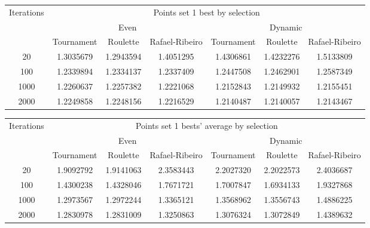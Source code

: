 \begin{center}
	\begin{tabular}{|c|c|c|c|c|c|c|}
		\hline
		\multirow{3}{*}{Iterations}	&	\multicolumn{6}{c|}{Points set 1 best by selection}	\\
										\cline{2-7}
									&	\multicolumn{3}{c|}{Even}	& \multicolumn{3}{c|}{Dynamic} \\
										\cline{2-7}
									&	Tournament		&	Roulette		&	Rafael-Ribeiro	&	Tournament		&	Roulette		&	Rafael-Ribeiro		\\
		\hline
		20							&	1.3035679		& 	1.2943594		&	1.4051295		&	1.4306861		&	1.4232276		&	1.5133809			\\
		\hline
		100							&	1.2339894		&	1.2334137		&	1.2337409		&	1.2447508		&	1.2462901		&	1.2587349			\\
		\hline
		1000						&	1.2260637		&	1.2257382		&	1.2221068		&	1.2152843		&	1.2149932		&	1.2155451			\\
		\hline
		2000						&	1.2249858		&	1.2248156		&	1.2216529		&	1.2140487		&	1.2140057		&	1.2143467			\\
		\hline
	\end{tabular}
	\label{tab:selection_type_1_best}
\end{center}

\begin{center}
	\begin{tabular}{|c|c|c|c|c|c|c|}
		\hline
		\multirow{3}{*}{Iterations}	&	\multicolumn{6}{c|}{Points set 1 bests' average by selection}	\\
										\cline{2-7}
									&	\multicolumn{3}{c|}{Even}	& \multicolumn{3}{c|}{Dynamic} \\
										\cline{2-7}
									&	Tournament		&	Roulette		&	Rafael-Ribeiro	&	Tournament		&	Roulette		&	Rafael-Ribeiro		\\
		\hline
		20							&	1.9092792		&	1.9141063		&	2.3583443		&	2.2027320		&	2.2022573		&	2.4036687			\\
		\hline
		100							&	1.4300238		&	1.4328046		&	1.7671721		&	1.7007847		&	1.6934133		&	1.9327868			\\
		\hline
		1000						&	1.2973567		&	1.2972244		&	1.3365121		&	1.3568962		&	1.3556743		&	1.4886225			\\
		\hline
		2000						&	1.2830978		&	1.2831009		&	1.3250863		&	1.3076324		&	1.3072849		&	1.4389632			\\
		\hline
	\end{tabular}
	\label{tab:selection_type_1_avg}
\end{center}

